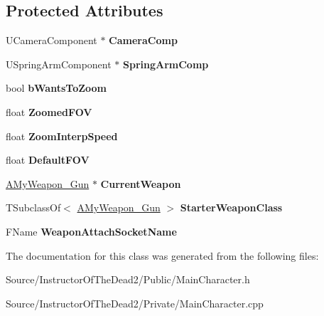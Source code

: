 \subsection*{Protected Attributes}
\begin{DoxyCompactItemize}
\item 
\mbox{\label{class_a_main_character_a83ceb44c34596cf092b3fbdaf6d66649}} 
U\+Camera\+Component $\ast$ {\bfseries Camera\+Comp}
\item 
\mbox{\label{class_a_main_character_a149e14225fb4febe5e2dc1d2cdf976fc}} 
U\+Spring\+Arm\+Component $\ast$ {\bfseries Spring\+Arm\+Comp}
\item 
\mbox{\label{class_a_main_character_a72af24b99adafa7b9d024732b00957c8}} 
bool {\bfseries b\+Wants\+To\+Zoom}
\item 
\mbox{\label{class_a_main_character_a6be486b784b9900a9217a022be6bcaa2}} 
float {\bfseries Zoomed\+F\+OV}
\item 
\mbox{\label{class_a_main_character_acb71d1fee43be1c94560bc6f427bdc3f}} 
float {\bfseries Zoom\+Interp\+Speed}
\item 
\mbox{\label{class_a_main_character_aff0b6ec995a455073f0f4bb50cb15624}} 
float {\bfseries Default\+F\+OV}
\item 
\mbox{\label{class_a_main_character_a564bee74c5e98baec0d48df92b73fd26}} 
\mbox{\hyperlink{class_a_my_weapon___gun}{A\+My\+Weapon\+\_\+\+Gun}} $\ast$ {\bfseries Current\+Weapon}
\item 
\mbox{\label{class_a_main_character_ab4701b65e5eaf3217ef385962c081620}} 
T\+Subclass\+Of$<$ \mbox{\hyperlink{class_a_my_weapon___gun}{A\+My\+Weapon\+\_\+\+Gun}} $>$ {\bfseries Starter\+Weapon\+Class}
\item 
\mbox{\label{class_a_main_character_a661bb8f07ac38949071c5683b0d33251}} 
F\+Name {\bfseries Weapon\+Attach\+Socket\+Name}
\end{DoxyCompactItemize}


The documentation for this class was generated from the following files\+:\begin{DoxyCompactItemize}
\item 
Source/\+Instructor\+Of\+The\+Dead2/\+Public/Main\+Character.\+h\item 
Source/\+Instructor\+Of\+The\+Dead2/\+Private/Main\+Character.\+cpp\end{DoxyCompactItemize}
